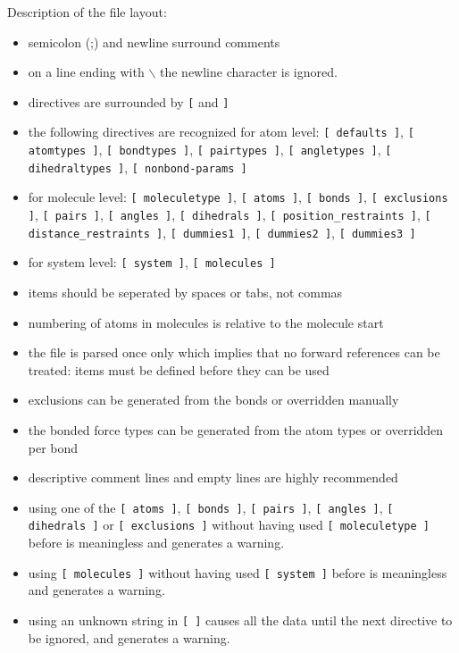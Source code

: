 Description of the file layout:
\begin{itemize}
\item semicolon (;) and newline surround comments
\item on a line ending with $\backslash$ the newline character is ignored.
\item directives are surrounded by \verb'[' and \verb']'
\item the following directives are recognized for atom level:
      \verb'[ defaults ]', \verb'[ atomtypes ]', \verb'[ bondtypes ]',
      \verb'[ pairtypes ]', \verb'[ angletypes ]', 
      \verb'[ dihedraltypes ]', \verb'[ nonbond-params ]'
\item for molecule level: \verb'[ moleculetype ]', \verb'[ atoms ]', 
      \verb'[ bonds ]', \verb'[ exclusions ]', \verb'[ pairs ]', 
      \verb'[ angles ]', \verb'[ dihedrals ]', 
      \verb'[ position_restraints ]', 
      \verb'[ distance_restraints ]', 
      \verb'[ dummies1 ]', \verb'[ dummies2 ]', \verb'[ dummies3 ]'
\item for system level: \verb'[ system ]', \verb'[ molecules ]'
\item items should be seperated by spaces or tabs, not commas
\item numbering of atoms in molecules is relative to the molecule start
\item the file is parsed once only which implies that no forward
      references can be treated: items must be defined before they
      can be used
\item exclusions can be generated from the bonds or
      overridden manually
\item the bonded force types can be generated from the atom types or
      overridden per bond
\item descriptive comment lines and empty lines are highly recommended
\item using one of the \verb'[ atoms ]', \verb'[ bonds ]', 
      \verb'[ pairs ]', \verb'[ angles ]', \verb'[ dihedrals ]' or
      \verb'[ exclusions ]' without having used 
      \verb'[ moleculetype ]' 
      before is meaningless and generates a warning.
\item using \verb'[ molecules ]' without having used
      \verb'[ system ]' before is meaningless and generates a warning.
\item using an unknown string in \verb'[ ]' causes all the data until
      the next directive to be ignored, and generates a warning.
\end{itemize}


